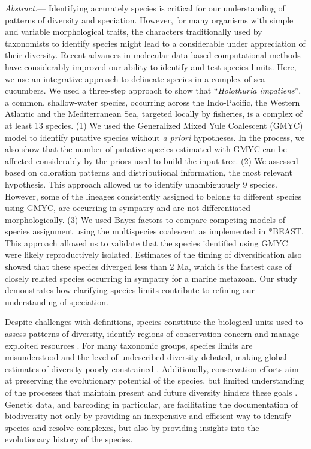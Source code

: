 \documentclass[12pt,letterpaper]{article}\usepackage[]{graphicx}\usepackage[]{color}
\renewcommand{\subsubsection}[1]{%
\vspace{2ex}
\noindent
\textit{#1.}---}
\begin{document}
\subsubsection{Abstract} Identifying accurately species is critical for our
understanding of patterns of diversity and speciation. However, for many
organisms with simple and variable morphological traits, the characters
traditionally used by taxonomists to identify species might lead to a
considerable under appreciation of their diversity. Recent advances in
molecular-data based computational methods have considerably improved our
ability to identify and test species limits. Here, we use an integrative
approach to delineate species in a complex of sea cucumbers. We used a
three-step approach to show that ``\textit{Holothuria impatiens}'', a common,
shallow-water species, occurring across the Indo-Pacific, the Western Atlantic
and the Mediterranean Sea, targeted locally by fisheries, is a complex of at
least 13 species. (1) We used the Generalized Mixed Yule Coalescent (GMYC) model
to identify putative species without \textit{a priori} hypotheses. In the
process, we also show that the number of putative species estimated with GMYC
can be affected considerably by the priors used to build the input tree. (2) We
assessed based on coloration patterns and distributional information, the most
relevant hypothesis. This approach allowed us to identify unambiguously 9
species. However, some of the lineages consistently assigned to belong to
different species using GMYC, are occurring in sympatry and are not
differentiated morphologically. (3) We used Bayes factors to compare competing
models of species assignment using the multispecies coalescent as implemented in
*BEAST. This approach allowed us to validate that the species identified using
GMYC were likely reproductively isolated. Estimates of the timing of
diversification also showed that these species diverged less than 2 Ma, which is
the fastest case of closely related species occurring in sympatry for a marine
metazoan. Our study demonstrates how clarifying species limits contribute to
refining our understanding of speciation.

\vspace{1.5in}



Despite challenges with definitions, species constitute the biological units
used to assess patterns of diversity, identify regions of conservation concern
and manage exploited resources \citep{Pimm2014}. For many taxonomic groups,
species limits are misunderstood and the level of undescribed diversity debated,
making global estimates of diversity poorly constrained
\citep{Appeltans2012,Costello2013}. Additionally, conservation efforts aim at
preserving the evolutionary potential of the species, but limited understanding
of the processes that maintain present and future diversity hinders these goals
\citep{Moritz2002}. Genetic data, and barcoding in particular, are facilitating
the documentation of biodiversity not only by providing an inexpensive and
efficient way to identify species and resolve complexes, but also by providing
insights into the evolutionary history of the species.
\end{document}
